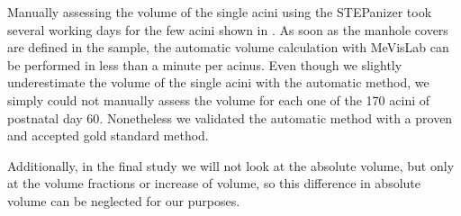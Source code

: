 \documentclass[%
	paper=a4,%
	abstract=true,%
	]{scrartcl}
\begin{document}
Manually assessing the volume of the single acini using the STEPanizer took several working days for the few acini shown in \label{fig:VolumeMeVisVsSTEPanizer}. As soon as the manhole covers are defined in the sample, the automatic volume calculation with MeVisLab can be performed in less than a minute per acinus. Even though we slightly underestimate the volume of the single acini with the automatic method, we simply could not manually assess the volume for each one of the 170 acini of postnatal day 60. Nonetheless we validated the automatic method with a proven and accepted gold standard method.

Additionally, in the final study we will not look at the absolute volume, but only at the volume fractions or increase of volume, so this difference in absolute volume can be neglected for our purposes.
\end{document}
